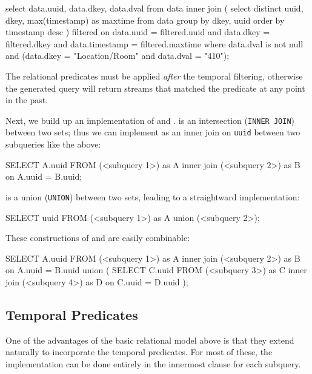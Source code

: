 \begin{sqlcode}
select data.uuid, data.dkey, data.dval
from data
inner join
(
    select distinct uuid, dkey, max(timestamp) as maxtime
    from data
    group by dkey, uuid order by timestamp desc
) filtered
on
    data.uuid = filtered.uuid
    and data.dkey = filtered.dkey
    and data.timestamp = filtered.maxtime
where data.dval is not null
and (data.dkey = "Location/Room" and data.dval = "410");
\end{sqlcode}

The relational predicates must be applied \emph{after} the temporal filtering,
otherwise the generated query will return streams that matched the predicate at
any point in the past.

Next, we build up an implementation of  and . 
is an intersection (\texttt{INNER JOIN}) between two sets; thus we can implement 
as an inner join on \texttt{uuid} between two subqueries like the above:

\begin{sqlcode}
SELECT A.uuid FROM
(<subquery 1>) as A
inner join
(<subquery 2>) as B
on
A.uuid = B.uuid;
\end{sqlcode}

 is a union (\texttt{UNION}) between two sets, leading to a straightward implementation:

\begin{sqlcode}
SELECT uuid FROM
(<subquery 1>) as A
union
(<subquery 2>);
\end{sqlcode}

These constructions of  and  are easily combinable:

\begin{sqlcode}

SELECT A.uuid FROM
(<subquery 1>) as A
inner join
(<subquery 2>) as B
on A.uuid = B.uuid
union
(
  SELECT C.uuid FROM
  (<subquery 3>) as C
  inner join
  (<subquery 4>) as D
  on C.uuid = D.uuid
);
\end{sqlcode}

\subsection{Temporal Predicates}

One of the advantages of the basic relational model above is that they extend naturally to incorporate
the temporal predicates. For most of these, the implementation can be done entirely in the innermost 
clause for each subquery.

